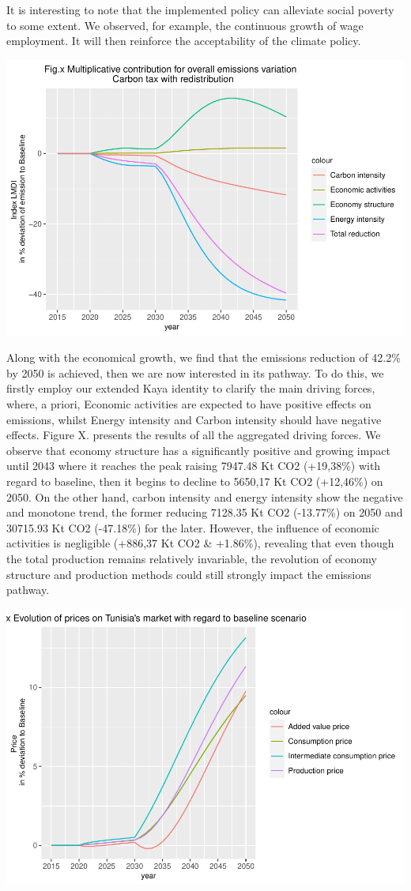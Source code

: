 \documentclass[
]{article}
\begin{document}
It is interesting to note that the implemented policy can alleviate
social poverty to some extent. We observed, for example, the continuous
growth of wage employment. It will then reinforce the acceptability of
the climate policy.

\begin{center}\includegraphics[width=0.7\linewidth,height=0.7\textheight]{Modele-ThreeMe-Tunisie_Sequeira_Valilou_Wang_files/figure-latex/unnamed-chunk-20-1} \end{center}

Along with the economical growth, we find that the emissions reduction
of 42.2\% by 2050 is achieved, then we are now interested in its
pathway. To do this, we firstly employ our extended Kaya identity to
clarify the main driving forces, where, a priori, Economic activities
are expected to have positive effects on emissions, whilst Energy
intensity and Carbon intensity should have negative effects. Figure X.
presents the results of all the aggregated driving forces. We observe
that economy structure has a significantly positive and growing impact
until 2043 where it reaches the peak raising 7947.48 Kt CO2 (+19,38\%)
with regard to baseline, then it begins to decline to 5650,17 Kt CO2
(+12,46\%) on 2050. On the other hand, carbon intensity and energy
intensity show the negative and monotone trend, the former reducing
7128.35 Kt CO2 (-13.77\%) on 2050 and 30715.93 Kt CO2 (-47.18\%) for the
later. However, the influence of economic activities is negligible
(+886,37 Kt CO2 \& +1.86\%), revealing that even though the total
production remains relatively invariable, the revolution of economy
structure and production methods could still strongly impact the
emissions pathway.

\begin{center}\includegraphics[width=0.7\linewidth,height=0.7\textheight]{Modele-ThreeMe-Tunisie_Sequeira_Valilou_Wang_files/figure-latex/unnamed-chunk-21-1} \end{center}
\end{document}
